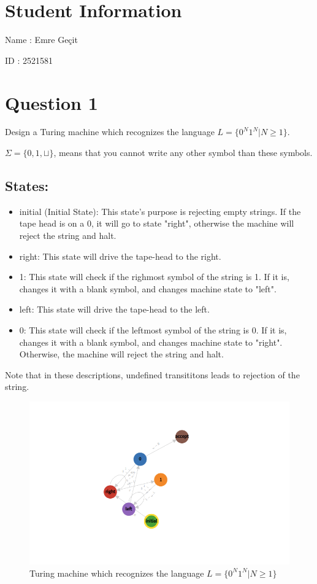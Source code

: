 \documentclass[12pt]{article}
\begin{document}
\section*{Student Information}

Name : Emre Geçit

ID : 2521581

\section*{Question 1}
Design a Turing machine which recognizes the language $L = \{0^N1^N | N \geq 1\}$.

$\Sigma = \{0, 1, \sqcup\}$, means that you cannot write any other symbol than these symbols.
\subsection*{States:}
\begin{itemize}
    \item initial (Initial State): This state's purpose is rejecting empty strings. If the tape head is on a 0, it will go to state "right", otherwise the machine will reject the string and halt.
    \item right: This state will drive the tape-head to the right.
    \item 1: This state will check if the righmost symbol of the string is 1. If it is, changes it with a blank symbol, and changes machine state to "left".
    \item left: This state will drive the tape-head to the left.
    \item 0: This state will check if the leftmost symbol of the string is 0. If it is, changes it with a blank symbol, and changes machine state to "right". Otherwise, the machine will reject the string and halt.
\end{itemize}
Note that in these descriptions, undefined transititons leads to rejection of the string.
\begin{figure}[H]
    \caption{Turing machine which recognizes the language $L = \{0^N1^N | N \geq 1\}$}
    \centering
    \includegraphics[width=13cm]{Q1/turingmachine.io_.png}    
\end{figure}
\newpage
\end{document}
